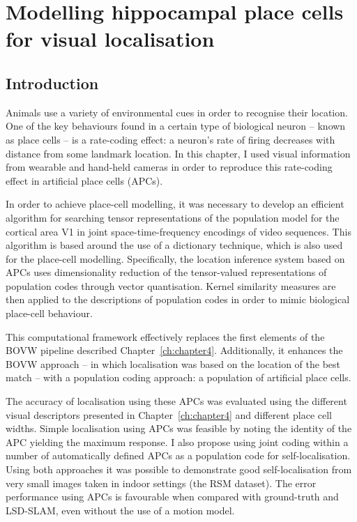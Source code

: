 \chapter{Modelling hippocampal place cells for visual localisation}\label{ch:chapter5} %


\section{Introduction}

Animals use a variety of environmental cues in order to recognise their location.  One of the key behaviours found in a certain type of biological neuron -- known as place cells -- is a rate-coding effect: a neuron's rate of firing decreases with distance from some landmark location. In this chapter, I used visual information from wearable and hand-held cameras in order to reproduce this rate-coding effect in artificial place cells (APCs). 

In order to achieve place-cell modelling, it was necessary to develop an efficient algorithm for searching tensor representations of the population model for the cortical area V1 in joint space-time-frequency encodings of video sequences.  This algorithm is based around the use of a dictionary technique, which is also used for the place-cell modelling. Specifically, the location inference system based on APCs uses  dimensionality reduction of the tensor-valued representations of  population codes through vector quantisation.  Kernel similarity measures are then applied to the descriptions of population codes in order to mimic biological place-cell behaviour. 

This computational framework effectively replaces the first elements of the BOVW pipeline described Chapter~\ref{ch:chapter4}. Additionally, it enhances the BOVW approach  -- in which localisation was based on the location of the best match -- with a population coding approach: a population of artificial place cells. 

The accuracy of localisation using these APCs was evaluated using the different visual descriptors presented in Chapter~\ref{ch:chapter4} and different place cell widths. Simple localisation using APCs was feasible by noting the identity of the APC yielding the maximum response. I also propose using joint coding within a number of automatically defined APCs as a population code for self-localisation. Using both approaches it was possible to demonstrate good self-localisation from very small images taken in indoor settings (the RSM dataset). The error performance using APCs is favourable when compared with ground-truth and LSD-SLAM, even without the use of a motion model.


